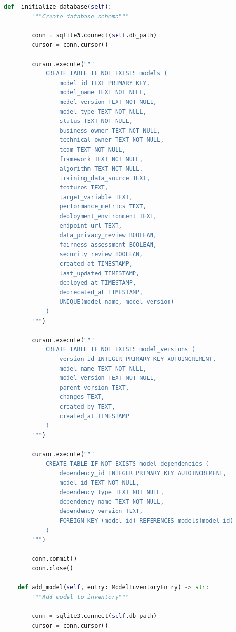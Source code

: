 \begin{lstlisting}[language=Python, caption=Model Inventory System]
    def _initialize_database(self):
        """Create database schema"""

        conn = sqlite3.connect(self.db_path)
        cursor = conn.cursor()

        cursor.execute("""
            CREATE TABLE IF NOT EXISTS models (
                model_id TEXT PRIMARY KEY,
                model_name TEXT NOT NULL,
                model_version TEXT NOT NULL,
                model_type TEXT NOT NULL,
                status TEXT NOT NULL,
                business_owner TEXT NOT NULL,
                technical_owner TEXT NOT NULL,
                team TEXT NOT NULL,
                framework TEXT NOT NULL,
                algorithm TEXT NOT NULL,
                training_data_source TEXT,
                features TEXT,
                target_variable TEXT,
                performance_metrics TEXT,
                deployment_environment TEXT,
                endpoint_url TEXT,
                data_privacy_review BOOLEAN,
                fairness_assessment BOOLEAN,
                security_review BOOLEAN,
                created_at TIMESTAMP,
                last_updated TIMESTAMP,
                deployed_at TIMESTAMP,
                deprecated_at TIMESTAMP,
                UNIQUE(model_name, model_version)
            )
        """)

        cursor.execute("""
            CREATE TABLE IF NOT EXISTS model_versions (
                version_id INTEGER PRIMARY KEY AUTOINCREMENT,
                model_name TEXT NOT NULL,
                model_version TEXT NOT NULL,
                parent_version TEXT,
                changes TEXT,
                created_by TEXT,
                created_at TIMESTAMP
            )
        """)

        cursor.execute("""
            CREATE TABLE IF NOT EXISTS model_dependencies (
                dependency_id INTEGER PRIMARY KEY AUTOINCREMENT,
                model_id TEXT NOT NULL,
                dependency_type TEXT NOT NULL,
                dependency_name TEXT NOT NULL,
                dependency_version TEXT,
                FOREIGN KEY (model_id) REFERENCES models(model_id)
            )
        """)

        conn.commit()
        conn.close()

    def add_model(self, entry: ModelInventoryEntry) -> str:
        """Add model to inventory"""

        conn = sqlite3.connect(self.db_path)
        cursor = conn.cursor()


\end{lstlisting}
